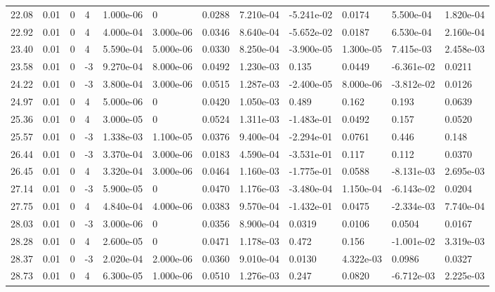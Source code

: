 \documentclass[preview]{standalone}
\begin{document}
{{{\begin{tabular}{L{1.2cm}C{1.2cm} C{0.3cm}C{0.5cm} C{1.4cm}C{1.4cm} C{1.4cm}C{1.4cm} C{1.6cm}C{1.6cm} C{1.6cm}C{1.6cm}}
  22.08  &  0.01  & 0     &  4 &  1.000e-06  & 0  &  0.0288&   7.210e-04& -5.241e-02 & 0.0174   &  5.500e-04 & 1.820e-04  \\ 
  22.92  &  0.01  & 0     &  4 &  4.000e-04  & 3.000e-06  &  0.0346&   8.640e-04& -5.652e-02 & 0.0187   &  6.530e-04 & 2.160e-04  \\ 
  23.40  &  0.01  & 0     &  4 &  5.590e-04  & 5.000e-06  &  0.0330&   8.250e-04& -3.900e-05 & 1.300e-05   &  7.415e-03 & 2.458e-03  \\ 
  23.58  &  0.01  & 0     & -3 &  9.270e-04  & 8.000e-06  &  0.0492&   1.230e-03& 0.135 & 0.0449   &  -6.361e-02 & 0.0211  \\ 
  24.22  &  0.01  & 0     & -3 &  3.800e-04  & 3.000e-06  &  0.0515&   1.287e-03& -2.400e-05 & 8.000e-06   &  -3.812e-02 & 0.0126  \\ 
  24.97  &  0.01  & 0     &  4 &  5.000e-06  & 0  &  0.0420&   1.050e-03& 0.489 & 0.162   &  0.193 & 0.0639  \\ 
  25.36  &  0.01  & 0     &  4 &  3.000e-05  & 0  &  0.0524&   1.311e-03& -1.483e-01 & 0.0492   &  0.157 & 0.0520  \\ 
  25.57  &  0.01  & 0     & -3 &  1.338e-03  & 1.100e-05  &  0.0376&   9.400e-04& -2.294e-01 & 0.0761   &  0.446 & 0.148  \\ 
  26.44  &  0.01  & 0     & -3 &  3.370e-04  & 3.000e-06  &  0.0183&   4.590e-04& -3.531e-01 & 0.117   &  0.112 & 0.0370  \\ 
  26.45  &  0.01  & 0     &  4 &  3.320e-04  & 3.000e-06  &  0.0464&   1.160e-03& -1.775e-01 & 0.0588   &  -8.131e-03 & 2.695e-03  \\ 
  27.14  &  0.01  & 0     & -3 &  5.900e-05  & 0  &  0.0470&   1.176e-03& -3.480e-04 & 1.150e-04   &  -6.143e-02 & 0.0204  \\ 
  27.75  &  0.01  & 0     &  4 &  4.840e-04  & 4.000e-06  &  0.0383&   9.570e-04& -1.432e-01 & 0.0475   &  -2.334e-03 & 7.740e-04  \\ 
  28.03  &  0.01  & 0     & -3 &  3.000e-06  & 0  &  0.0356&   8.900e-04& 0.0319 & 0.0106   &  0.0504 & 0.0167  \\ 
  28.28  &  0.01  & 0     &  4 &  2.600e-05  & 0  &  0.0471&   1.178e-03& 0.472 & 0.156   &  -1.001e-02 & 3.319e-03  \\ 
  28.37  &  0.01  & 0     & -3 &  2.020e-04  & 2.000e-06  &  0.0360&   9.010e-04& 0.0130 & 4.322e-03   &  0.0986 & 0.0327  \\ 
  28.73  &  0.01  & 0     &  4 &  6.300e-05  & 1.000e-06  &  0.0510&   1.276e-03& 0.247 & 0.0820   &  -6.712e-03 & 2.225e-03  \\ 

\end{tabular}}}}
\end{document}
